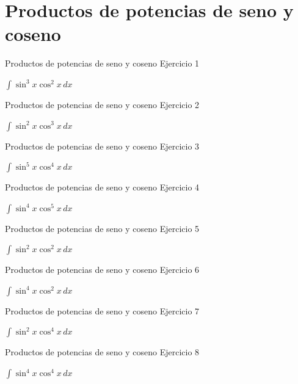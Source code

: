 \documentclass[10pt,aspectratio=169]{beamer}
\newcommand{\ejercicio}[1]{%
  \begin{center}
  \vfill
  {\fontsize{24}{30}\selectfont #1}
  \vfill
  \end{center}
}
\begin{document}
\section{Productos de potencias de seno y coseno}
\begin{frame}{Productos de potencias de seno y coseno}
\small Ejercicio 1
\ejercicio{$\displaystyle \int \sin^3 x\cos^2 x\,dx$}
\end{frame}
\begin{frame}{Productos de potencias de seno y coseno}
\small Ejercicio 2
\ejercicio{$\displaystyle \int \sin^2 x\cos^3 x\,dx$}
\end{frame}
\begin{frame}{Productos de potencias de seno y coseno}
\small Ejercicio 3
\ejercicio{$\displaystyle \int \sin^5 x\cos^4 x\,dx$}
\end{frame}
\begin{frame}{Productos de potencias de seno y coseno}
\small Ejercicio 4
\ejercicio{$\displaystyle \int \sin^4 x\cos^5 x\,dx$}
\end{frame}
\begin{frame}{Productos de potencias de seno y coseno}
\small Ejercicio 5
\ejercicio{$\displaystyle \int \sin^2 x\cos^2 x\,dx$}
\end{frame}
\begin{frame}{Productos de potencias de seno y coseno}
\small Ejercicio 6
\ejercicio{$\displaystyle \int \sin^4 x\cos^2 x\,dx$}
\end{frame}
\begin{frame}{Productos de potencias de seno y coseno}
\small Ejercicio 7
\ejercicio{$\displaystyle \int \sin^2 x\cos^4 x\,dx$}
\end{frame}
\begin{frame}{Productos de potencias de seno y coseno}
\small Ejercicio 8
\ejercicio{$\displaystyle \int \sin^4 x\cos^4 x\,dx$}
\end{frame}

\end{document}

